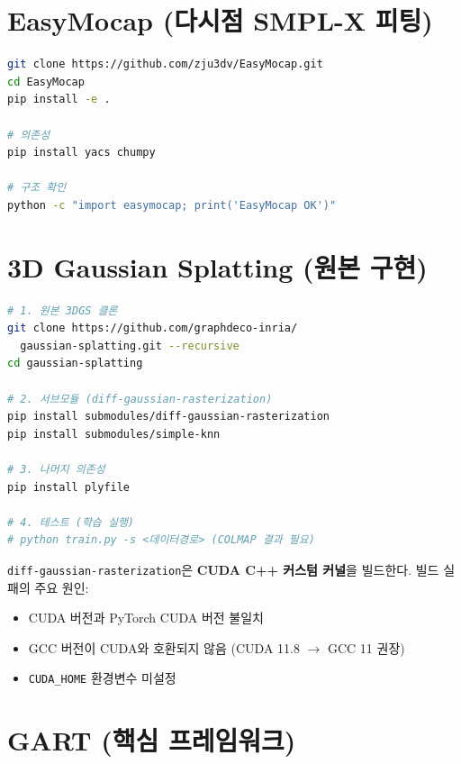 \documentclass[11pt, a4paper]{report}
\begin{document}
\section{EasyMocap (다시점 SMPL-X 피팅)}

\begin{termbox}[title={EasyMocap 설치}]
\begin{lstlisting}[language=bash, numbers=none]
git clone https://github.com/zju3dv/EasyMocap.git
cd EasyMocap
pip install -e .

# 의존성
pip install yacs chumpy

# 구조 확인
python -c "import easymocap; print('EasyMocap OK')"
\end{lstlisting}
\end{termbox}


\section{3D Gaussian Splatting (원본 구현)}

\begin{termbox}[title={3DGS + 미분 가능 래스터라이저 설치}]
\begin{lstlisting}[language=bash, numbers=none]
# 1. 원본 3DGS 클론
git clone https://github.com/graphdeco-inria/
  gaussian-splatting.git --recursive
cd gaussian-splatting

# 2. 서브모듈 (diff-gaussian-rasterization)
pip install submodules/diff-gaussian-rasterization
pip install submodules/simple-knn

# 3. 나머지 의존성
pip install plyfile

# 4. 테스트 (학습 실행)
# python train.py -s <데이터경로> (COLMAP 결과 필요)
\end{lstlisting}
\end{termbox}

\begin{warningbox}
\texttt{diff-gaussian-rasterization}은 \textbf{CUDA C++ 커스텀 커널}을 빌드한다.
빌드 실패의 주요 원인:
\begin{itemize}[nosep]
  \item CUDA 버전과 PyTorch CUDA 버전 불일치
  \item GCC 버전이 CUDA와 호환되지 않음 (CUDA 11.8 $\rightarrow$ GCC 11 권장)
  \item \texttt{CUDA\_HOME} 환경변수 미설정
\end{itemize}
\end{warningbox}


\section{GART (핵심 프레임워크)}
\end{document}
